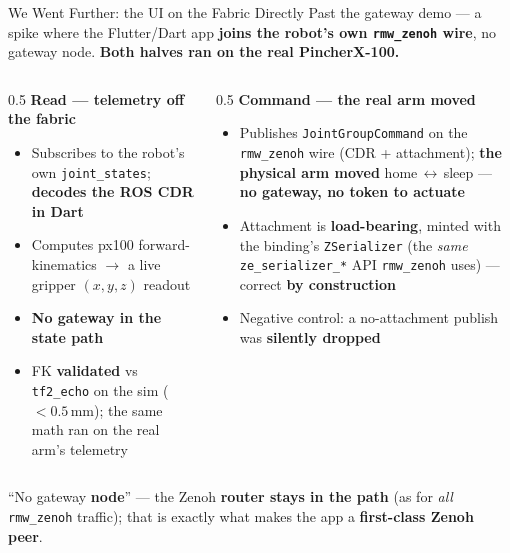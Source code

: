 \documentclass[9pt]{beamer}
\begin{document}
\begin{frame}{We Went Further: the UI on the Fabric Directly}
  Past the gateway demo --- a spike where the Flutter/Dart app \textbf{joins the robot's own \texttt{rmw\_zenoh} wire}, no gateway node. \textbf{Both halves ran on the real PincherX-100.}

  \vspace{0.2em}
  \begin{columns}[T]
    \begin{column}{0.5\textwidth}
      \textbf{Read --- telemetry off the fabric}
      \begin{itemize}\small
        \item Subscribes to the robot's own \texttt{joint\_states}; \textbf{decodes the ROS CDR in Dart}
        \item Computes px100 forward-kinematics $\to$ a live gripper $(x,y,z)$ readout
        \item \textbf{No gateway in the state path}
        \item {\scriptsize FK \textbf{validated} vs \texttt{tf2\_echo} on the sim ($<0.5$\,mm); the same math ran on the real arm's telemetry}
      \end{itemize}
    \end{column}
    \begin{column}{0.5\textwidth}
      \textbf{Command --- the real arm moved}
      \begin{itemize}\small
        \item Publishes \texttt{JointGroupCommand} on the \texttt{rmw\_zenoh} wire (CDR + attachment); \textbf{the physical arm moved} home\,$\leftrightarrow$\,sleep --- \textbf{no gateway, no token to actuate}
        \item Attachment is \textbf{load-bearing}, minted with the binding's \texttt{ZSerializer} (the \emph{same} \texttt{ze\_serializer\_*} API \texttt{rmw\_zenoh} uses) --- correct \textbf{by construction}
        \item {\scriptsize Negative control: a no-attachment publish was \textbf{silently dropped}}
      \end{itemize}
    \end{column}
  \end{columns}

  \vspace{0.2em}
  \begin{center}
    {\small ``No gateway \textbf{node}'' --- the Zenoh \textbf{router stays in the path} (as for \emph{all} \texttt{rmw\_zenoh} traffic); that is exactly what makes the app a \textbf{first-class Zenoh peer}.}
  \end{center}
\end{frame}
\end{document}
